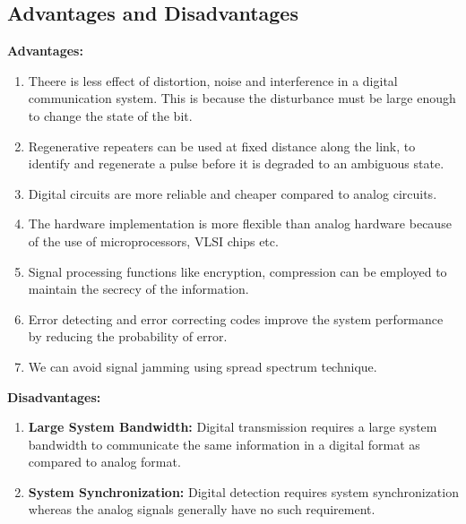 \subsection{Advantages and Disadvantages}

\textbf{Advantages:}

\begin{enumerate}

  \item Theere is less effect of distortion, noise and interference in a digital
  communication system. This is because the disturbance must be large enough to
  change the state of the bit.

  \item Regenerative repeaters can be used at fixed distance along the link, to
  identify and regenerate a pulse before it is degraded to an ambiguous state.

  \item Digital circuits are more reliable and cheaper compared to analog
  circuits.

  \item The hardware implementation is more flexible than analog hardware because
  of the use of microprocessors, VLSI chips etc.

  \item Signal processing functions like encryption, compression can be employed
  to maintain the secrecy of the information.

  \item Error detecting and error correcting codes improve the system performance
  by reducing the probability of error.


  \item We can avoid signal jamming using spread spectrum technique.

\end{enumerate}

\textbf{Disadvantages:}

\begin{enumerate}

  \item \textbf{Large System Bandwidth:} Digital transmission requires a large system
  bandwidth to communicate the same information in a digital format as compared to
  analog format.

  \item \textbf{System Synchronization:} Digital detection requires system synchronization
  whereas the analog signals generally have no such requirement.

\end{enumerate}

